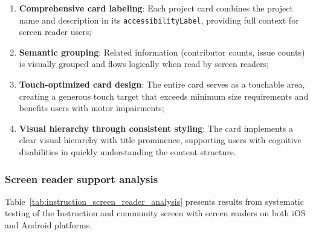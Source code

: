 \begin{enumerate}
    \item \textbf{Comprehensive card labeling}: Each project card combines the project name and description in its \texttt{accessibilityLabel}, providing full context for screen reader users;
    
    \item \textbf{Semantic grouping}: Related information (contributor counts, issue counts) is visually grouped and flows logically when read by screen readers;
    
    \item \textbf{Touch-optimized card design}: The entire card serves as a touchable area, creating a generous touch target that exceeds minimum size requirements and benefits users with motor impairments;
    
    \item \textbf{Visual hierarchy through consistent styling}: The card implements a clear visual hierarchy with title prominence, supporting users with cognitive disabilities in quickly understanding the content structure.
\end{enumerate}

\subsubsection{Screen reader support analysis}

Table~\ref{tab:instruction_screen_reader_analysis} presents results from systematic testing of the Instruction and community screen with screen readers on both iOS and Android platforms.

